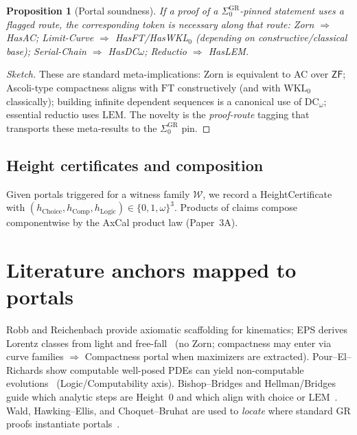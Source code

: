 \documentclass[11pt]{article}
\newtheorem{proposition}[theorem]{Proposition}
\theoremstyle{definition}
\theoremstyle{remark}
\newcommand{\ZF}{\mathsf{ZF}}
\newcommand{\LEM}{\mathrm{LEM}}
\newcommand{\FT}{\mathrm{FT}}
\newcommand{\WKLz}{\mathrm{WKL}_0}
\newcommand{\DCw}{\mathrm{DC}_\omega}
\newcommand{\SigmaZero}{\Sigma_{0}}
\newcommand{\hChoice}{h_{\mathrm{Choice}}}    %
\newcommand{\hComp}{h_{\mathrm{Comp}}}        %
\newcommand{\hLogic}{h_{\mathrm{Logic}}}      %
\begin{document}
\begin{proposition}[Portal soundness]\label{prop:portals}
If a proof of a $\SigmaZero^{\mathrm{GR}}$-pinned statement uses a flagged route, the corresponding token is necessary along that route: Zorn $\Rightarrow$ HasAC; Limit-Curve $\Rightarrow$ HasFT/HasWKL$_0$ (depending on constructive/classical base); Serial-Chain $\Rightarrow$ HasDC$\omega$; Reductio $\Rightarrow$ HasLEM.
\end{proposition}

\begin{proof}[Sketch]
These are standard meta-implications: Zorn is equivalent to AC over $\ZF$; Ascoli-type compactness aligns with $\FT$ constructively (and with $\WKLz$ classically); building infinite dependent sequences is a canonical use of $\DCw$; essential reductio uses $\LEM$. The novelty is the \emph{proof-route} tagging that transports these meta-results to the $\SigmaZero^{\mathrm{GR}}$ pin.
\end{proof}

\subsection{Height certificates and composition}
Given portals triggered for a witness family $\mathcal{W}$, we record a HeightCertificate with $(\hChoice,\hComp,\hLogic)\in\{0,1,\omega\}^3$. Products of claims compose componentwise by the AxCal product law (Paper~3A).

\section{Literature anchors mapped to portals}
Robb and Reichenbach provide axiomatic scaffolding for kinematics; EPS derives Lorentz classes from light and free-fall~\cite{Robb1914,Reichenbach1969,EPS1972} (no Zorn; compactness may enter via curve families $\Rightarrow$ Compactness portal when maximizers are extracted). Pour--El--Richards show computable well-posed PDEs can yield non-computable evolutions~\cite{PourElRichards1989} (Logic/Computability axis). Bishop--Bridges and Hellman/Bridges guide which analytic steps are Height~0 and which align with choice or $\LEM$~\cite{BishopBridges1985,Hellman1998,BridgesReply1995}. Wald, Hawking--Ellis, and Choquet--Bruhat are used to \emph{locate} where standard GR proofs instantiate portals~\cite{Wald1984,HawkingEllis1973,ChoquetBruhat2009}.
\end{document}
